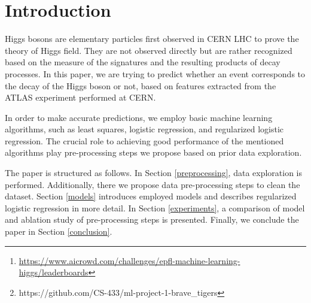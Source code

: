 


\begin{abstract}

Machine learning approaches have become an indispensable part of numerous research fields, providing predictions and explanations of complex multidimensional datasets. In this paper, we focus on developing an approach for detecting whether an event corresponds to the decay of the Higgs boson or not, based on features extracted from the ATLAS experiment performed at CERN. Our best approach uses regularized logistic regression with splitting on the number of jets, feature expansion, median imputing, and outlier bounding. It achieves $0.831\%$ accuracy on the Higgs boson machine learning challenge at AIcrowd platform.\footnote{\hyperlink{AIcrowd}{https://www.aicrowd.com/challenges/epfl-machine-learning-higgs/leaderboards}} The source code of this project is available on GitHub.\footnote{https://github.com/CS-433/ml-project-1-brave\_tigers}

\end{abstract}


\section{Introduction}

Higgs bosons are elementary particles first observed in CERN LHC to prove the theory of Higgs field. They are not observed directly but are rather recognized based on the measure of the signatures and the resulting products of decay processes. In this paper, we are trying to predict whether an event corresponds to the decay of the Higgs boson or not, based on features extracted from the ATLAS experiment performed at CERN.

In order to make accurate predictions, we employ basic machine learning algorithms, such as least squares, logistic regression, and regularized logistic regression. The crucial role to achieving good performance of the mentioned algorithms play pre-processing steps we propose based on prior data exploration.

The paper is structured as follows. In Section \ref{preprocessing}, data exploration is performed. Additionally, there we propose data pre-processing steps to clean the dataset. Section \ref{models} introduces employed models and describes regularized logistic regression in more detail. In Section \ref{experiments}, a comparison of model and ablation study of pre-processing steps is presented. Finally, we conclude the paper in Section \ref{conclusion}. 








